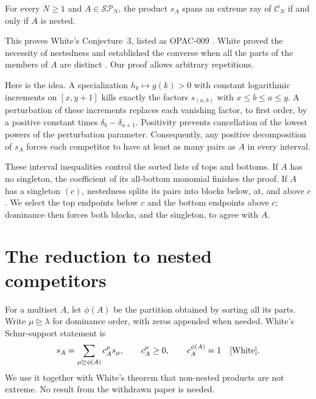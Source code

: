 \documentclass[11pt]{amsart}
\renewcommand{\C}{\mathcal C}
\newcommand{\SP}{\mathcal{SP}}
\newcommand{\dom}{\trianglerighteq}
\begin{document}
\begin{theorem}\label{thm:main}
For every $N\ge1$ and $A\in\SP_N$, the product $s_A$ spans an extreme
ray of $\C_N$ if and only if $A$ is nested.
\end{theorem}

This proves White's Conjecture~3, listed as OPAC-009 \cite{OPAC}. White proved the
necessity of nestedness and established the converse when all the parts
of the members of $A$ are distinct \cite[Theorems~4 and~12]{White}.
Our proof allows arbitrary repetitions.

Here is the idea. A specialization $h_k\mapsto g(k)>0$ with constant
logarithmic increments on $[x,y+1]$ kills exactly the factors
$s_{(a,b)}$ with $x\le b\le a\le y$. A perturbation of these increments
replaces each vanishing factor, to first order, by a positive constant
times $\delta_b-\delta_{a+1}$. Positivity prevents cancellation of the
lowest powers of the perturbation parameter. Consequently, any positive
decomposition of $s_A$ forces each competitor to have at least as many
pairs as $A$ in every interval.

These interval inequalities control the sorted lists of tops and
bottoms. If $A$ has no singleton, the coefficient of its all-bottom
monomial finishes the proof. If $A$ has a singleton $(c)$, nestedness
splits its pairs into blocks below, at, and above $c$. We select the
top endpoints below $c$ and the bottom endpoints above $c$; dominance
then forces both blocks, and the singleton, to agree with $A$.

\section{The reduction to nested competitors}

For a multiset $A$, let $\phi(A)$ be the partition obtained by sorting
all its parts. Write $\mu\dom\lambda$ for dominance order, with zeros
appended when needed. White's Schur-support statement is
\begin{equation}\label{eq:support}
 s_A=\sum_{\mu\dom\phi(A)}c_A^\mu s_\mu,
 \qquad c_A^\mu\ge0,\qquad c_A^{\phi(A)}=1
 \quad\text{\cite[Proposition~6]{White}.}
\end{equation}
We use it together with White's theorem that non-nested products are
not extreme. No result from the withdrawn paper \cite{GMTWYZ} is needed.
\end{document}
